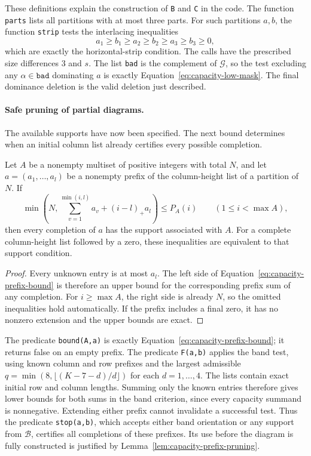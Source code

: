 These definitions explain the construction of \texttt{B} and
\texttt{C} in the code. The function \texttt{parts} lists all
partitions with at most three parts. For such partitions $a,b$, the
function \texttt{strip} tests the interlacing inequalities
\[
 a_1\ge b_1\ge a_2\ge b_2\ge a_3\ge b_3\ge0,
\]
which are exactly the horizontal-strip condition. The calls have
the prescribed size differences $3$ and $s$. The list \texttt{bad}
is the complement of $\mathcal G$, so the test excluding any
$\alpha\in\texttt{bad}$ dominating $a$ is exactly
Equation~\eqref{eq:capacity-low-mask}. The final dominance deletion
is the valid deletion just described.

\paragraph{Safe pruning of partial diagrams.}
The available supports have now been specified. The next bound determines
when an initial column list already certifies every possible completion.

\begin{lemma}
\label{lem:capacity-prefix-pruning}
Let $A$ be a nonempty multiset of positive integers with total $N$, and let
$a=(a_1,\ldots,a_l)$ be a nonempty prefix of the column-height list
of a partition of $N$. If
\begin{equation}
 \min\left(N,\sum_{v=1}^{\min(i,l)}a_v+(i-l)_+a_l\right)
 \le P_A(i)\qquad(1\le i<\max A),
 \label{eq:capacity-prefix-bound}
\end{equation}
then every completion of $a$ has the support associated with $A$.
For a complete column-height list followed by a zero, these inequalities
are equivalent to that support condition.
\end{lemma}

\begin{proof}
Every unknown entry is at most $a_l$. The left side of
Equation~\eqref{eq:capacity-prefix-bound} is therefore an upper
bound for the corresponding prefix sum of any completion. For
$i\ge\max A$, the right side is already $N$, so the omitted
inequalities hold automatically. If the prefix includes a final
zero, it has no nonzero extension and the upper bounds are exact.
\end{proof}

The predicate \texttt{bound(A,a)} is exactly
Equation~\eqref{eq:capacity-prefix-bound}; it returns false on an
empty prefix. The predicate \texttt{F(a,b)} applies the band test,
using known column and row prefixes and the largest admissible
$q=\min(8,\lfloor(K-7-d)/d\rfloor)$ for each $d=1,\ldots,4$.
The lists contain exact initial row and column lengths. Summing
only the known entries therefore gives lower bounds for both sums
in the band criterion, since every capacity summand is nonnegative.
Extending either prefix cannot invalidate a successful test.
Thus the predicate \texttt{stop(a,b)}, which accepts either band
orientation or any support from $\mathcal B$, certifies all
completions of these prefixes. Its use before the diagram is fully
constructed is justified by Lemma~\ref{lem:capacity-prefix-pruning}.

